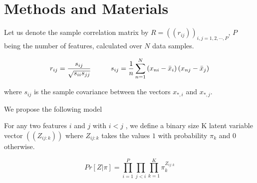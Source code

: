 \section{Methods and Materials}


Let us denote the sample correlation matrix by $R = ((r_{ij}))_{i, j = 1,2, \cdots, P} $, $P$ being the number of features, calculated over $N$ data samples.

\flushleft
\begin{equation}
r_{ij} = \frac{s_{ij}}{\sqrt{s_{ii} s_{jj}}}   \hspace{1 cm} s_{ij} = \frac{1}{n} \sum_{n=1}^{N} \left ( x_{ni} - \bar{x}_{i} \right ) \left ( x_{nj} - \bar{x}_{j} \right ) 
\end{equation}

where $s_{ij}$ is the sample covariance between the vectors $x_{*,i}$ and $x_{*,j}$.

We propose the following model

For any two features $i$ and $j$ with $ i < j$ , we define a binary size K latent variable vector $((Z_{ij:k}))$  where $Z_{ij:k}$ takes the values $1$ with probability $\pi_{k}$ and $0$ otherwise. 


\begin{equation}
Pr \left [ Z | \pi \right ] = \prod_{i=1}^{P} \prod_{j < i} \prod_{k=1}^{K} \pi_{k}^{Z_{ij:k}}  
\end{equation}

